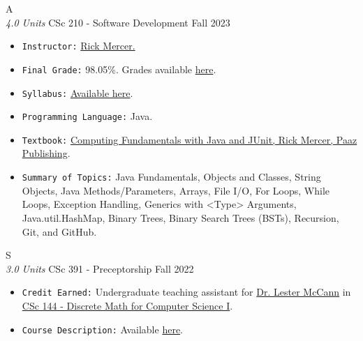 \cventry
{A \\ \small{\textit{4.0 Units}}}
{CSc 210 - Software Development}
{Fall 2023}
{}
{}
{
  \begin{itemize}
    \item \texttt{Instructor:} \href{https://www.cs.arizona.edu/person/rick-mercer}{Rick Mercer.}
    \item \texttt{Final Grade:} 98.05\%. Grades available \href{https://mhrezaei.com/assets/cv/courses/Fall2023/CSC210/Grades.pdf}{here}.
    \item \texttt{Syllabus:} \href{https://mhrezaei.com/assets/cv/courses/Fall2023/CSC210/Syllabus.pdf}{Available here}.
    \item \texttt{Programming Language:} Java.
    \item \texttt{Textbook:} \href{https://www.lulu.com/shop/rick-mercer/computing-fundamentals-with-java-and-junit/paperback/product-23373195.html?page=1&pageSize=4}{Computing Fundamentals with Java and JUnit, Rick Mercer, Paaz Publishing}.
    \item \texttt{Summary of Topics:} Java Fundamentals, Objects and Classes, String Objects, Java Methods/Parameters, Arrays, File I/O, For Loops, While Loops, Exception Handling, Generics with <Type> Arguments, Java.util.HashMap, Binary Trees, Binary Search Trees (BSTs), Recursion, Git, and GitHub.
  \end{itemize}
}

\cventry
{S \\ \small{\textit{3.0 Units}}}
{CSc 391 - Preceptorship}
{Fall 2022}
{}
{}
{
  \begin{itemize}
    \item \texttt{Credit Earned:} Undergraduate teaching assistant for \href{https://mccann.cs.arizona.edu/}{Dr. Lester McCann} in \href{https://www2.cs.arizona.edu/classes/cs144/fall23-002/}{CSc 144 - Discrete Math for Computer Science I}.
    \item \texttt{Course Description:} Available \href{https://mhrezaei.com/assets/cv/courses/Fall2023/CSC391/Syllabus.pdf}{here}.
  \end{itemize}
}

